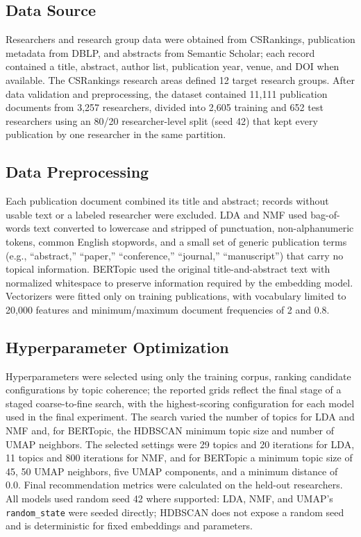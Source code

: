 \subsection{Data Source}
Researchers and research group data were obtained from CSRankings, publication metadata from DBLP, and abstracts from Semantic Scholar; each record contained a title, abstract, author list, publication year, venue, and DOI when available. The CSRankings research areas defined 12 target research groups. After data validation and preprocessing, the dataset contained 11,111 publication documents from 3,257 researchers, divided into 2,605 training and 652 test researchers using an 80/20 researcher-level split (seed 42) that kept every publication by one researcher in the same partition.

\subsection{Data Preprocessing}
Each publication document combined its title and abstract; records without usable text or a labeled researcher were excluded. LDA and NMF used bag-of-words text converted to lowercase and stripped of punctuation, non-alphanumeric tokens, common English stopwords, and a small set of generic publication terms (e.g., ``abstract,'' ``paper,'' ``conference,'' ``journal,'' ``manuscript'') that carry no topical information. BERTopic used the original title-and-abstract text with normalized whitespace to preserve information required by the embedding model. Vectorizers were fitted only on training publications, with vocabulary limited to 20,000 features and minimum/maximum document frequencies of 2 and 0.8.

\subsection{Hyperparameter Optimization}
Hyperparameters were selected using only the training corpus, ranking candidate configurations by topic coherence; the reported grids reflect the final stage of a staged coarse-to-fine search, with the highest-scoring configuration for each model used in the final experiment. The search varied the number of topics for LDA and NMF and, for BERTopic, the HDBSCAN minimum topic size and number of UMAP neighbors. The selected settings were 29 topics and 20 iterations for LDA, 11 topics and 800 iterations for NMF, and for BERTopic a minimum topic size of 45, 50 UMAP neighbors, five UMAP components, and a minimum distance of 0.0. Final recommendation metrics were calculated on the held-out researchers. All models used random seed 42 where supported: LDA, NMF, and UMAP's \texttt{random\_state} were seeded directly; HDBSCAN does not expose a random seed and is deterministic for fixed embeddings and parameters.

